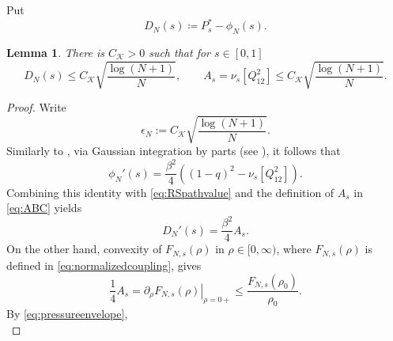 \documentclass[11pt]{article}
\newtheorem{lemma}[theorem]{Lemma}
\numberwithin{equation}{section}
\newcommand{\E}{\mathbb{E}}
\newcommand{\1}{\mathbf 1}
\newcommand{\cK}{\mathcal K}
\newcommand{\braket}[1]{\left\langle #1\right\rangle}
\begin{document}
Put
\begin{equation}
 D_N(s)\coloneqq P_s^*-\phi_N(s).
 \label{eq:DN}
\end{equation}
\begin{lemma}
\label{lem:preconcentration}
There is $C_\cK>0$ such that for $s\in [0,1]$
\begin{equation}
 D_N(s)\le C_{\cK} 
 \sqrt{\frac{\log(N+1)}N},
 \qquad
 A_s=\nu_s[Q_{12}^2]\le C_{\cK} 
 \sqrt{\frac{\log(N+1)}N}.
 \label{eq:preconcentration}
\end{equation}
\end{lemma}
\begin{proof}
Write 
$$\epsilon_N:= C_{\cK} 
 \sqrt{\frac{\log(N+1)}N}.$$
Similarly to \cite[(14)]{KusuokaNakajima1}, via Gaussian integration by parts (see \cite[Vol.~1,~Sec.~A.4]{Talagrand}), it follows that
\begin{equation}\label{eq:p-derivative}
\phi_N'(s)
=\frac{\beta^2}{4}\left(
(1-q)^2
-
\nu_s[Q_{12}^2]\right).
\end{equation}
Combining this identity with \eqref{eq:RSpathvalue} and the definition
of $A_s$ in \eqref{eq:ABC} yields
\begin{equation}
 D_N'(s)=\frac{\beta^2}{4}A_s. 
 \label{eq:DNprime}
\end{equation}
On the other hand, convexity of $F_{N,s}(\rho)$ in $\rho \in [0,\infty)$, where $F_{N,s}(\rho)$ is defined in \eqref{eq:normalizedcoupling}, gives
\begin{equation}\label{eq:lemreconcentration1}
   \frac14A_s
 =\left.\partial_\rho F_{N,s}(\rho)\right|_{\rho=0+}
 \le\frac{F_{N,s}(\rho_0)}{\rho_0}.  
\end{equation}
By \eqref{eq:pressureenvelope},
\begin{equation}\label{eq:lemreconcentration2}

\end{equation}
\end{proof}
\end{document}
